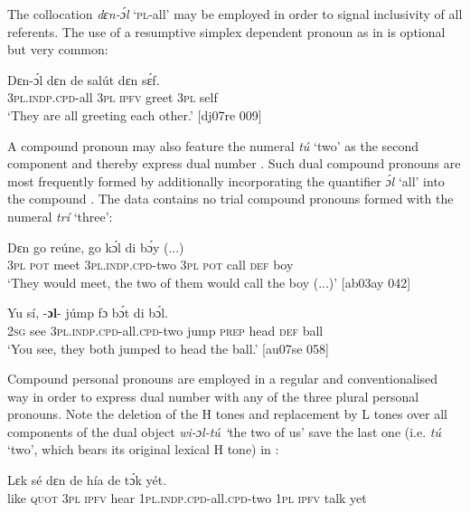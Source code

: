 The collocation \textit{dɛn-ɔ́l} ‘\textsc{pl}{}-all’ may be employed in order to signal inclusivity of all referents. The use of a resumptive simplex dependent pronoun as in  is optional but very common: 



\ea%
    \label{ex:key:293}
    \gll Dɛn-ɔ́l      dɛn  de  salút  dɛn  sɛ́f.\\
\textsc{3pl.indp.cpd-}all  \textsc{3pl}  \textsc{ipfv}  greet  \textsc{3pl}  self\\

\glt ‘They are all greeting each other.’ [dj07re 009]
\z

A compound pronoun may also feature the numeral \textit{tú} ‘two’ as the second component and thereby express dual number . Such dual compound pronouns are most frequently formed by additionally incorporating the quantifier \textit{ɔ́l} ‘all’ into the compound . The data contains no trial compound pronouns formed with the numeral \textit{trí} ‘three’:


\ea%
    \label{ex:key:294}
    \gll Dɛn  go  reúne,          go  kɔ́l  di  bɔ́y  (...)\\
\textsc{3pl}  \textsc{pot}  meet  \textsc{3pl.indp.cpd-}two  \textsc{3pl}  \textsc{pot}  call  \textsc{def}  boy\\

\glt ‘They would meet, the two of them would call the boy (...)’  [ab03ay 042]
\z


\ea%
    \label{ex:key:295}
    \gll Yu  sí,  -\textbf{ɔl}{}-     júmp  fɔ  bɔ́t    di  bɔ́l.\\
\textsc{2sg}  see  \textsc{3pl.indp.cpd-}all.\textsc{cpd}{}-two  jump  \textsc{prep}  head  \textsc{def}  ball\\

\glt ‘You see, they both jumped to head the ball.’ [au07se 058]
\z

Compound personal pronouns are employed in a regular and conventionalised way in order to express dual number with any of the three plural personal pronouns. Note the deletion of the H tones and replacement by L tones over all components of the dual object \textit{wi-ɔl-tú ‘}the two of us’ save the last one (i.e. \textit{tú} ‘two’, which bears its original lexical H tone) in :


\ea%
    \label{ex:key:296}
    \gll Lɛk  sé    dɛn  de    hía          de  tɔ́k  yét.\\
like  \textsc{quot}  \textsc{3pl}  \textsc{ipfv}  hear    \textsc{1pl.indp.cpd-}all.\textsc{cpd}{}-two  \textsc{1pl}  \textsc{ipfv}  talk  yet\\

